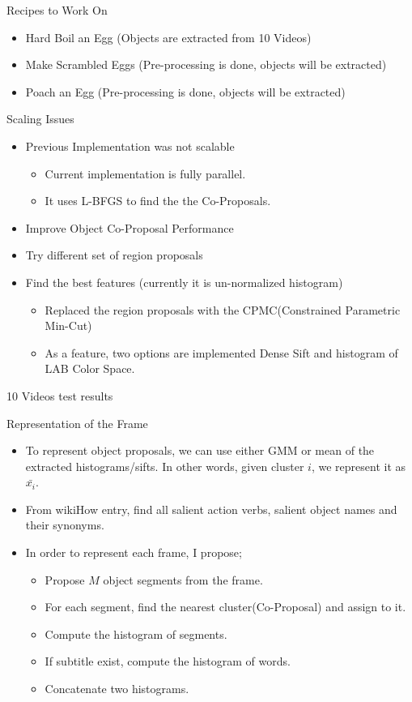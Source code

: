\begin{frame}{Recipes to Work On}
\begin{itemize}
\item Hard Boil an Egg‏‎ (Objects are extracted from 10 Videos)
\item Make Scrambled Eggs‏‎ (Pre-processing is done, objects will be extracted)
\item Poach an Egg‏‎ (Pre-processing is done, objects will be extracted)
\end{itemize}
\end{frame}

\begin{frame}{Scaling Issues}
\begin{itemize}
\item Previous Implementation was not scalable
\begin{itemize}
\item Current implementation is fully parallel.
\item It uses L-BFGS to find the the Co-Proposals.
\end{itemize}
\item Improve Object Co-Proposal Performance
\item Try different set of region proposals
\item Find the best features (currently it is un-normalized histogram)
\begin{itemize}
\item Replaced the region proposals with the CPMC(Constrained Parametric Min-Cut)
\item As a feature, two options are implemented Dense Sift and histogram of LAB Color Space.
\end{itemize}
\end{itemize}
10 Videos test results
\end{frame}


\begin{frame}{Representation of the Frame}
\begin{itemize}
\item To represent object proposals, we can use either GMM or mean of the extracted histograms/sifts. In other words, given cluster $i$, we represent it as $\bar{x_i}$.
\item From wikiHow entry, find all salient action verbs, salient object names and their synonyms.
\item In order to represent each frame, I propose;
\begin{itemize}
\item Propose $M$ object segments from the frame.
\item For each segment, find the nearest cluster(Co-Proposal) and assign to it.
\item Compute the histogram of segments.
\item If subtitle exist, compute the histogram of words.
\item Concatenate two histograms.
\end{itemize}
\end{itemize}
\end{frame}

